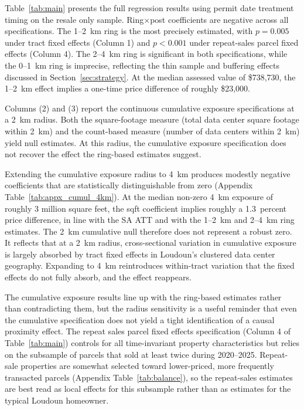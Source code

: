\documentclass[12pt]{article}
\begin{document}
Table~\ref{tab:main} presents the full regression results using permit date treatment timing on the resale only sample. Ring$\times$post coefficients are negative across all specifications. The 1--2~km ring is the most precisely estimated, with $p=0.005$ under tract fixed effects (Column 1) and $p<0.001$ under repeat-sales parcel fixed effects (Column 4). The 2--4~km ring is significant in both specifications, while the 0--1~km ring is imprecise, reflecting the thin sample and buffering effects discussed in Section~\ref{sec:strategy}. At the median assessed value of \$738,730, the 1--2~km effect implies a one-time price difference of roughly \$23,000.



Columns (2) and (3) report the continuous cumulative exposure specifications at a 2~km radius. Both the square-footage measure (total data center square footage within 2~km) and the count-based measure (number of data centers within 2~km) yield null estimates. At this radius, the cumulative exposure specification does not recover the effect the ring-based estimates suggest.

Extending the cumulative exposure radius to 4~km produces modestly negative coefficients that are statistically distinguishable from zero (Appendix Table~\ref{tab:appx_cumul_4km}). At the median non-zero 4~km exposure of roughly 3 million square feet, the sqft coefficient implies roughly a 1.3~percent price difference, in line with the SA ATT and with the 1--2~km and 2--4~km ring estimates. The 2~km cumulative null therefore does not represent a robust zero. It reflects that at a 2~km radius, cross-sectional variation in cumulative exposure is largely absorbed by tract fixed effects in Loudoun's clustered data center geography. Expanding to 4~km reintroduces within-tract variation that the fixed effects do not fully absorb, and the effect reappears.

The cumulative exposure results line up with the ring-based estimates rather than contradicting them, but the radius sensitivity is a useful reminder that even the cumulative specification does not yield a tight identification of a causal proximity effect. The repeat sales parcel fixed effects specification (Column 4 of Table~\ref{tab:main}) controls for all time-invariant property characteristics but relies on the subsample of parcels that sold at least twice during 2020--2025. Repeat-sale properties are somewhat selected toward lower-priced, more frequently transacted parcels (Appendix Table~\ref{tab:balance}), so the repeat-sales estimates are best read as local effects for this subsample rather than as estimates for the typical Loudoun homeowner.
\end{document}
